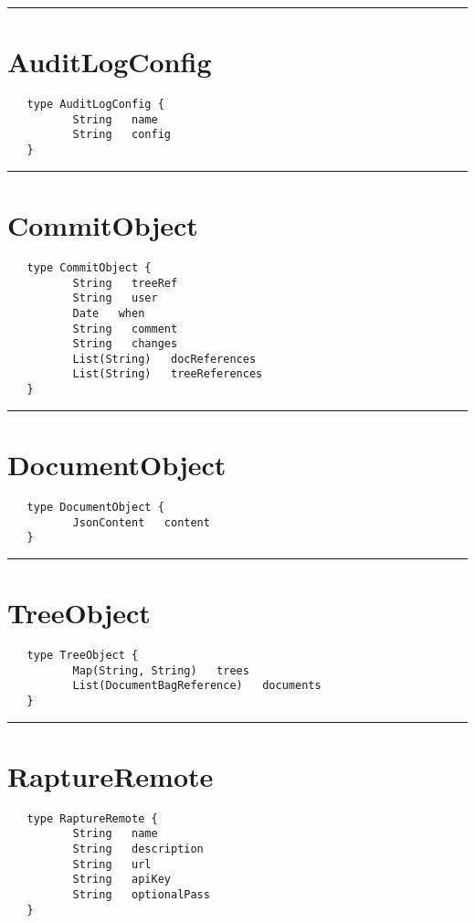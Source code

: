 \rule{15cm}{2pt}
\section{AuditLogConfig}
\label{type:AuditLogConfig}

\begin{verbatim}
   type AuditLogConfig {
          String   name
          String   config
   }
\end{verbatim}

\rule{15cm}{2pt}
\section{CommitObject}
\label{type:CommitObject}

\begin{verbatim}
   type CommitObject {
          String   treeRef
          String   user
          Date   when
          String   comment
          String   changes
          List(String)   docReferences
          List(String)   treeReferences
   }
\end{verbatim}

\rule{15cm}{2pt}
\section{DocumentObject}
\label{type:DocumentObject}

\begin{verbatim}
   type DocumentObject {
          JsonContent   content
   }
\end{verbatim}

\rule{15cm}{2pt}
\section{TreeObject}
\label{type:TreeObject}

\begin{verbatim}
   type TreeObject {
          Map(String, String)   trees
          List(DocumentBagReference)   documents
   }
\end{verbatim}

\rule{15cm}{2pt}
\section{RaptureRemote}
\label{type:RaptureRemote}

\begin{verbatim}
   type RaptureRemote {
          String   name
          String   description
          String   url
          String   apiKey
          String   optionalPass
   }
\end{verbatim}

